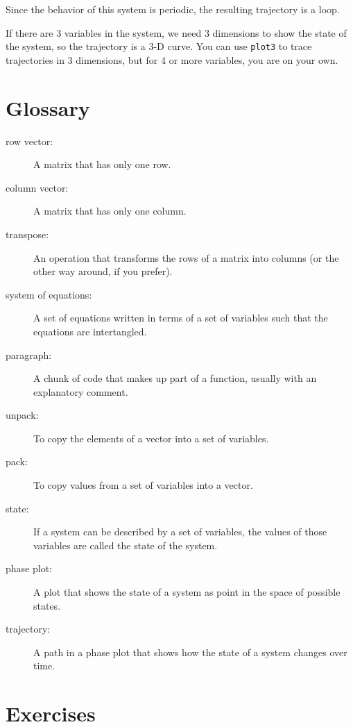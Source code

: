 \documentclass{book}
\begin{document}
Since the behavior of this system is periodic, the resulting
trajectory is a loop.

If there are 3 variables in the system, we need 3 dimensions to show
the state of the system, so the trajectory is a 3-D curve.
You can use {\tt plot3} to trace trajectories in 3 dimensions,
but for 4 or more variables, you are on your own.


\section{Glossary}

\begin{description}

\item[row vector:] A matrix that has only one row. 

\item[column vector:] A matrix that has only one column. 

\item[transpose:] An operation that transforms the rows of a matrix
into columns (or the other way around, if you prefer). 

\item[system of equations:] A set of equations written in terms of
a set of variables such that the equations are intertangled.

\item[paragraph:] A chunk of code that makes up part of a function,
usually with an explanatory comment. 

\item[unpack:] To copy the elements of a vector into a set of variables.

\item[pack:] To copy values from a set of variables into a vector. 

\item[state:] If a system can be described by a set of variables,
the values of those variables are called the state of the system.

\item[phase plot:] A plot that shows the state of a system as point
in the space of possible states.  

\item[trajectory:] A path in a phase plot that shows how the state of
a system changes over time.


\end{description}

\section{Exercises}
\end{document}
